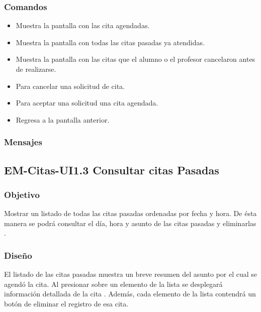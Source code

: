 \subsubsection{Comandos}
	\begin{itemize}
		\item {} Muestra la pantalla con las cita agendadas.
		\item {} Muestra la pantalla con todas las citas pasadas ya atendidas.
		\item {} Muestra la pantalla con las citas que el alumno o el profesor cancelaron antes de realizarse.
		\item {} Para cancelar una solicitud de cita.
		\item {} Para aceptar una solicitud una cita agendada.
		\item {} Regresa a la pantalla anterior.
	\end{itemize}

\subsubsection{Mensajes}
	\noindent
	
\pagebreak


\subsection{EM-Citas-UI1.3 Consultar citas Pasadas}

\subsubsection{Objetivo}
	\noindent
	Mostrar un listado de todas las citas pasadas ordenadas por fecha y hora. De ésta manera se podrá consultar el día, hora y asunto de las citas pasadas y eliminarlas .

\subsubsection{Diseño}
	\noindent
	El listado de las citas pasadas muestra un breve resumen del asunto por el cual se agendó la cita.
	Al presionar sobre un elemento de la lista se desplegará información detallada de 
	la cita . Además, cada elemento de la lista contendrá un botón de eliminar el registro de esa cita.

